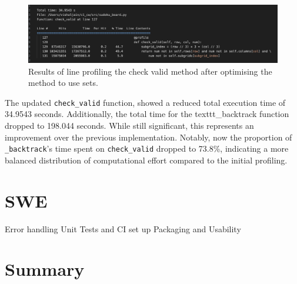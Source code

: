 \documentclass[11pt]{article}
\begin{document}
\begin{figure}
    \centering
    \includegraphics[width=1\textwidth]{figs/check_valid_after.png}
    \caption{Results of line profiling the check valid method after optimising the method to use sets.}
    \label{fig:line_profiling_check_valid_after}
\end{figure}


The updated \texttt{check\_valid} function, showed a reduced total execution time of 34.9543 seconds. Additionally, the total time for the texttt{\_backtrack} function dropped to 198.044 seconds. While still significant, this represents an improvement over the previous implementation. Notably, now the proportion of \texttt{\_backtrack}'s time  spent on \texttt{check\_valid} dropped to 73.8\%, indicating a more balanced distribution of computational effort compared to the initial profiling.



\section {SWE}

Error handling
Unit Tests and CI set up
Packaging and Usability

\section {Summary}


\end{document}

